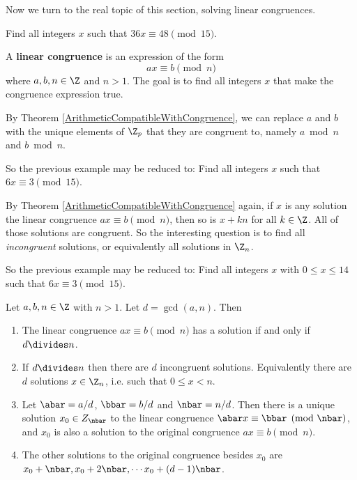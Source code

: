 \documentclass[oneside,12pt]{amsart}
\begin{document}
Now we turn to the real topic of this section, solving linear congruences.

\begin{example}
Find all integers $x$ such that $36x \equiv 48 \pmod{15}$.
\end{example}

A \textbf{linear congruence} is an expression of the form
$$ax\equiv b \pmod n$$
where $a,b,n\in \Z$ and $n>1$. The goal is to find all integers $x$ that
make the congruence expression true.

\bigskip

By Theorem \ref{ArithmeticCompatibleWithCongruence}, we can replace $a$ and $b$ with
the unique elements of $\Z_p$ that they are congruent to, namely $a\bmod n$ and $b\bmod n$.

\begin{example}
So the previous example may be reduced to:
Find all integers $x$ such that $6x \equiv 3 \pmod{15}$.
\end{example}

By Theorem \ref{ArithmeticCompatibleWithCongruence} again, if $x$ is any solution 
the linear congruence $ax\equiv b \pmod n$, then so is $x+kn$ for all $k\in\Z$.
All of those solutions are congruent. So the interesting question is to find all \emph{incongruent} solutions, or
equivalently all solutions in $\Z_n$.

\begin{example}
So the previous example may be reduced to:
Find all integers $x$ with $0\leq x \leq 14$ such that $6x \equiv 3 \pmod{15}$.
\end{example}

\begin{theorem}
Let $a,b,n\in \Z$ with $n>1$. Let $d=\gcd(a,n)$. Then
\begin{enumerate}
\item The linear congruence $ax\equiv b \pmod n$ has a solution if and only if $d\divides n$.
\item If $d\divides n$ then there are $d$ incongruent solutions. Equivalently there are
$d$ solutions $x\in \Z_n$, i.e. such that $0\leq x < n$.
\item Let $\abar = a/d$, $\bbar=b/d$ and $\nbar = n/d$. Then there is a unique solution 
$x_0\in Z_{\nbar}$ to the linear
congruence $\abar x\equiv  \bbar \pmod \nbar$, and $x_0$ is also a solution to the original
congruence $ax\equiv b \pmod n$.
\item The other solutions to the original congruence besides $x_0$ are $x_0 + \nbar, x_0 + 2\nbar, \cdots x_0 + (d-1)\nbar$.
\end{enumerate}
\end{theorem}
\end{document}

